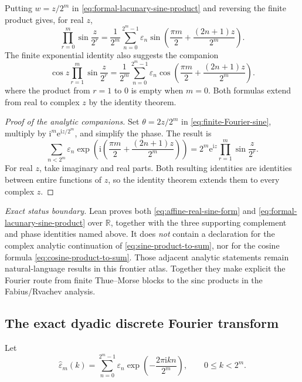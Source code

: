 \documentclass[11pt,oneside]{article}
\numberwithin{equation}{section}
\theoremstyle{definition}
\theoremstyle{remark}
\newcommand{\R}{\mathbb R}
\newcommand{\e}{\mathrm e}
\newcommand{\ii}{\mathrm i}
\newcommand{\eps}{\varepsilon}
\begin{document}
Putting \(w=z/2^m\) in \eqref{eq:formal-lacunary-sine-product} and reversing
the finite product gives, for real \(z\),
\begin{equation}
  \boxed{
  \prod_{r=0}^{m}\sin\frac{z}{2^r}
  =\frac1{2^m}\sum_{n=0}^{2^m-1}\eps_n
   \sin\!\left(
     \frac{\pi m}{2}+\frac{(2n+1)z}{2^m}
   \right).}
  \label{eq:sine-product-to-sum}
\end{equation}
The finite exponential identity also suggests the companion
\begin{equation}
  \boxed{
  \cos z\prod_{r=1}^{m}\sin\frac{z}{2^r}
  =\frac1{2^m}\sum_{n=0}^{2^m-1}\eps_n
   \cos\!\left(
     \frac{\pi m}{2}+\frac{(2n+1)z}{2^m}
   \right).}
  \label{eq:cosine-product-to-sum}
\end{equation}
where the product from \(r=1\) to \(0\) is empty when \(m=0\).
Both formulas extend from real to complex \(z\) by the identity theorem.

\begin{proof}[Proof of the analytic companions]
Set \(\theta=2z/2^m\) in
\eqref{eq:finite-Fourier-sine}, multiply by
\(\ii^m\e^{\ii z/2^m}\), and simplify the phase.  The result is
\[
 \sum_{n<2^m}\eps_n
 \exp\!\left(\ii\left(
   \frac{\pi m}{2}+\frac{(2n+1)z}{2^m}
 \right)\right)
 =2^m\e^{\ii z}\prod_{r=1}^{m}\sin\frac z{2^r}.
\]
For real \(z\), take imaginary and real parts.  Both resulting identities
are identities between entire functions of \(z\), so the identity theorem
extends them to every complex \(z\).
\end{proof}

\emph{Exact status boundary.}  Lean proves both
\eqref{eq:affine-real-sine-form} and
\eqref{eq:formal-lacunary-sine-product} over \(\R\), together with the three
supporting complement and phase identities named above.  It does \emph{not}
contain a declaration for the complex analytic continuation of
\eqref{eq:sine-product-to-sum}, nor for the cosine formula
\eqref{eq:cosine-product-to-sum}.  Those adjacent analytic statements remain
natural-language results in this frontier atlas.  Together they make explicit
the Fourier route from finite Thue--Morse blocks to the sinc products in the
Fabius/Rvachev analysis.

\subsection{The exact dyadic discrete Fourier transform}

Let
\begin{equation}
  \widehat\eps_m(k)=
  \sum_{n=0}^{2^m-1}\eps_n
  \exp\!\left(-\frac{2\pi\ii kn}{2^m}\right),
  \qquad 0\le k<2^m.
  \label{eq:DFT-definition}
\end{equation}
\end{document}
